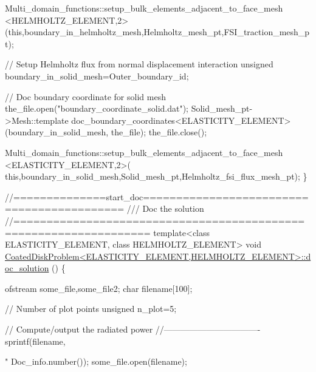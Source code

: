 \begin{DoxyCodeInclude}
{  Multi\_domain\_functions::setup\_bulk\_elements\_adjacent\_to\_face\_mesh
  <HELMHOLTZ\_ELEMENT,2>
  (\textcolor{keyword}{this},boundary\_in\_helmholtz\_mesh,Helmholtz\_mesh\_pt,FSI\_traction\_mesh\_pt);

 \textcolor{comment}{// Setup Helmholtz flux from normal displacement interaction}
 \textcolor{keywordtype}{unsigned} boundary\_in\_solid\_mesh=Outer\_boundary\_id;

 \textcolor{comment}{// Doc boundary coordinate for solid mesh}
 the\_file.open(\textcolor{stringliteral}{"boundary\_coordinate\_solid.dat"});
 Solid\_mesh\_pt->Mesh::template doc\_boundary\_coordinates<ELASTICITY\_ELEMENT>
  (boundary\_in\_solid\_mesh, the\_file);
 the\_file.close();

 Multi\_domain\_functions::setup\_bulk\_elements\_adjacent\_to\_face\_mesh
  <ELASTICITY\_ELEMENT,2>(
   \textcolor{keyword}{this},boundary\_in\_solid\_mesh,Solid\_mesh\_pt,Helmholtz\_fsi\_flux\_mesh\_pt);
\}



\textcolor{comment}{//==============start\_doc===========================================}\textcolor{comment}{}
\textcolor{comment}{/// Doc the solution}
\textcolor{comment}{}\textcolor{comment}{//==================================================================}
\textcolor{keyword}{template}<\textcolor{keyword}{class} ELASTICITY\_ELEMENT, \textcolor{keyword}{class} HELMHOLTZ\_ELEMENT>
\textcolor{keywordtype}{void} \hyperlink{classCoatedDiskProblem_af8e103d494f526c0e24c0c4ccef4ea6b}{CoatedDiskProblem<ELASTICITY\_ELEMENT,HELMHOLTZ\_ELEMENT>::doc\_solution}
      ()
\{

 ofstream some\_file,some\_file2;
 \textcolor{keywordtype}{char} filename[100];

 \textcolor{comment}{// Number of plot points}
 \textcolor{keywordtype}{unsigned} n\_plot=5; 

 \textcolor{comment}{// Compute/output the radiated power}
 \textcolor{comment}{//----------------------------------}
 sprintf(filename,\textcolor{stringliteral}{"%
         Doc\_info.number());
 some\_file.open(filename);

}}
\end{DoxyCodeInclude}
